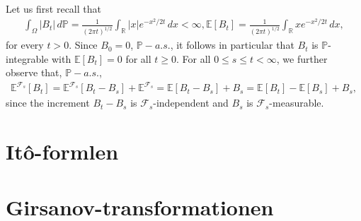 \documentclass{article}
\numberwithin{equation}{section}
\begin{document}
Let us first recall that
\begin{align}
    \int_{\Omega} |B_t| \, d\mathbb{P} = \frac{1}{(2\pi t)^{1/2}}\int_\mathbb{R} |x| e^{-x^2/2t} \, dx < \infty,
    \mathbb{E}[B_t] = \frac{1}{(2\pi t)^{1/2}}\int_\mathbb{R}xe^{-x^2/2t} \, dx,
\end{align}
for every $t > 0$.
Since $B_0 = 0$, $\mathbb{P}-a.s.$, it follows in particular that $B_t$ is $\mathbb{P}$-integrable with $\mathbb{E}[B_t] = 0$ for all $t \geq 0$.
For all $0 \leq s \leq t < \infty$, we further observe that, $\mathbb{P}-a.s.$,
\begin{align}
    \mathbb{E}^{\mathcal{F}_s}[B_t] = \mathbb{E}^{\mathcal{F}_s}[B_t - B_s] + \mathbb{E}^{\mathcal{F}_s} = \mathbb{E}[B_t - B_s] + B_s = \mathbb{E}[B_t] - \mathbb{E}[B_s] + B_s, 
\end{align}
since the increment $B_t - B_s$ is $\mathcal{F}_s$-independent and $B_s$ is $\mathcal{F}_s$-measurable.

\newpage

\section{Itô-formlen}

\newpage

\section{Girsanov-transformationen}
\end{document}
